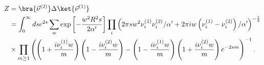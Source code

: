 \begin{equation}
\begin{split}
 Z &= \bra{\vec \nu^{(2)}} \Delta \ket{\vec \nu^{(1)}} \\
   &= \int_{0}^{\infty} ds e^{2s} \sum_{w} 
     \exp \left[ - \frac{w^2 R^2 s}{2 \alpha'}\right] \prod_i
   \left(2 \pi s w^2 \nu_i^{(1)}\nu_i^{(2)}/\alpha' 
  + 2 \pi i w 
 \left(\nu_i^{(1)} - \nu_i^{(2)}\right)/ \alpha' \right)^{-\frac12}
   \\ & \times
  \prod_{m \geq 1} \left(\left(1 + \frac{i \nu_i^{(1)} w}{m}\right)
             \left(1 - \frac{i \nu_i^{(2)} w}{m}\right) -
                         \left(1 - \frac{i \nu_i^{(1)} w}{m}\right)
                         \left(1 + \frac{i \nu_i^{(2)} w}{m}\right)
     e^{-2sm}\right)^{-1} .
\end{split}
\end{equation}

